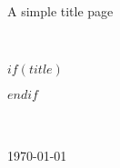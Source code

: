 %
%
\begin{titlepage}

\center %
 
A simple title page

\HRule \\[0.3cm]
{ \Huge \bfseries 
$if(title)$
\maketitle 
$endif$
}\\[0.4cm] 

\HRule \\[1cm]
 

{\large \today}\\[2cm] %

\vfill %

\end{titlepage}
